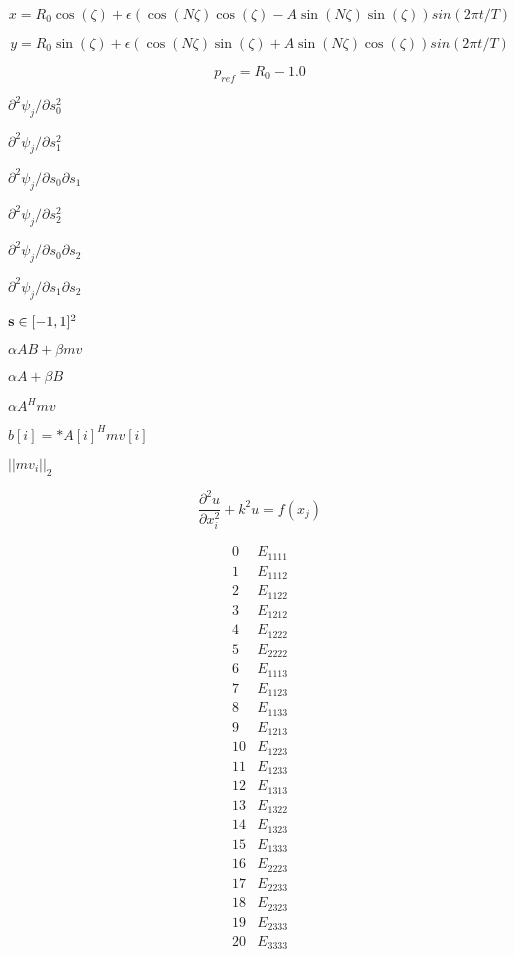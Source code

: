 \documentclass{article}
\begin{document}
\[ x = R_0 \cos(\zeta) + \epsilon \left( \cos(N \zeta) \cos(\zeta) - A \sin(N \zeta) \sin(\zeta) \right) sin(2 \pi t/T) \]
\pagebreak

\[ y = R_0 \sin(\zeta) + \epsilon \left( \cos(N \zeta) \sin(\zeta) + A \sin(N \zeta) \cos(\zeta) \right) sin(2 \pi t/T) \]
\pagebreak

\[ p_{ref} = R_0 - 1.0 \]
\pagebreak

$ \partial ^2 \psi_j / \partial s_0^2 $
\pagebreak

$ \partial ^2 \psi_j / \partial s_1^2 $
\pagebreak

$ \partial ^2 \psi_j / \partial s_0 \partial s_1 $
\pagebreak

$ \partial ^2 \psi_j / \partial s_2^2 $
\pagebreak

$ \partial ^2 \psi_j / \partial s_0 \partial s_2 $
\pagebreak

$ \partial ^2 \psi_j / \partial s_1 \partial s_2 $
\pagebreak

$ {\bf s} \in [-1,1]^2 $
\pagebreak

$ \alpha AB + \beta mv $
\pagebreak

$\alpha A + \beta B$
\pagebreak

$ \alpha A^Hmv $
\pagebreak

$ b[i] = * A[i]^Hmv[i] $
\pagebreak

$||mv_i||_2$
\pagebreak

\[ \frac{\partial^2 u}{\partial x_i^2} + k^2 u = f(x_j) \]
\pagebreak

\[\begin{array}{cc} 0 & E_{1111} \\ 1 & E_{1112} \\ 2 & E_{1122} \\ 3 & E_{1212} \\ 4 & E_{1222} \\ 5 & E_{2222} \\ 6 & E_{1113} \\ 7 & E_{1123} \\ 8 & E_{1133} \\ 9 & E_{1213} \\ 10 & E_{1223} \\ 11 & E_{1233} \\ 12 & E_{1313} \\ 13 & E_{1322} \\ 14 & E_{1323} \\ 15 & E_{1333} \\ 16 & E_{2223} \\ 17 & E_{2233} \\ 18 & E_{2323} \\ 19 & E_{2333} \\ 20 & E_{3333} \end{array}\]
\pagebreak
\end{document}
